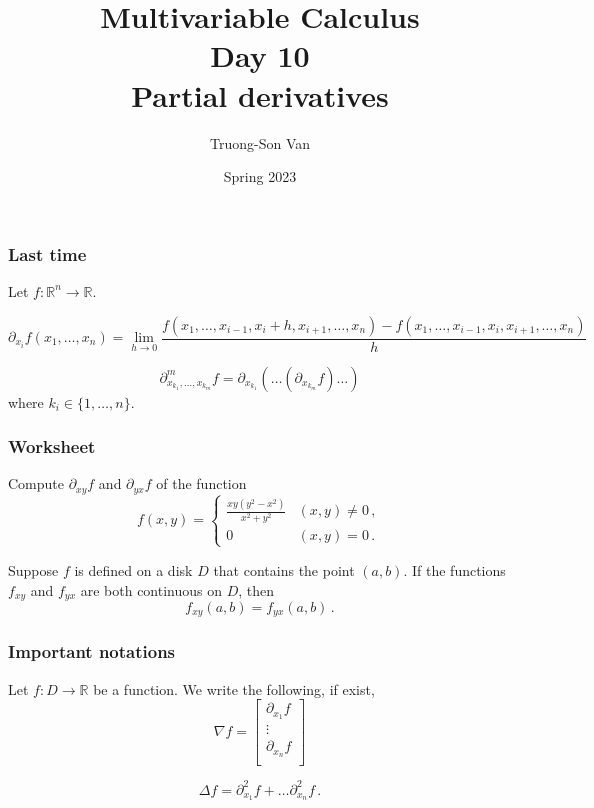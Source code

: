 \documentclass[aspectratio=169,handout]{beamer}
\title{ Multivariable Calculus \\ Day 10\\ Partial derivatives}
\institute{Fulbright University Vietnam}
\author{Truong-Son Van}
\date{Spring 2023}
\newcommand{\R}{\mathbb{R}}
\begin{document}
\maketitle


\begin{frame}
    \frametitle{Last time}
     
    Let
    $f: \mathbb{R}^n \to \R$.

\begin{equation*}
    \partial_{x_i} f(x_1, \dots, x_n) 
    = \lim_{h\to 0} \frac{ f(x_1, \dots, x_{i-1}, x_i + h , x_{i+1}, \dots, x_n) - f(x_1, \dots, x_{i-1}, x_i  , x_{i+1}, \dots, x_n)}{h} 
\end{equation*}

\begin{equation*}
    \partial^m_{x_{k_1}, \dots, x_{k_m}} f = \partial_{x_{k_1}} (\dots ( \partial_{x_{k_m}} f) \dots)
\end{equation*}
where $k_i \in \{1,\dots, n\}$.
\end{frame}


\begin{frame}
    \frametitle{ Worksheet }
    Compute $\partial_{xy} f$ and $\partial_{yx} f$ of the function
    \begin{equation*}
        f(x,y) = 
        \begin{cases}
            \frac{xy(y^2 - x^2)}{x^2 + y^2}  & (x,y) \not= 0 \,, \\
            0 & (x,y) = 0 \,.
        \end{cases}
    \end{equation*}
\end{frame}


\begin{frame}
\begin{theorem}
Suppose \(f\) is defined on a disk \(D\) that contains the point \((a,b)\).
If the functions \(f_{xy}\) and \(f_{yx}\) are both continuous on \(D\), then
\begin{equation*}
    f_{xy}(a,b) = f_{yx}(a,b) \,.
\end{equation*}
\end{theorem}
\end{frame}


\begin{frame}
    \frametitle{Important notations}

Let \(f:D \to \mathbb{R}\) be a function. We write the following, if exist,
\begin{equation*}
    \nabla f = \begin{bmatrix}
        \partial_{x_1} f\\
        \vdots \\
        \partial_{x_n} f\\
    \end{bmatrix}
\end{equation*}

\begin{equation*}
    \Delta f = \partial_{x_1}^2 f + \dots \partial_{x_n}^2 f \,.
\end{equation*}
\end{frame}
\end{document}
